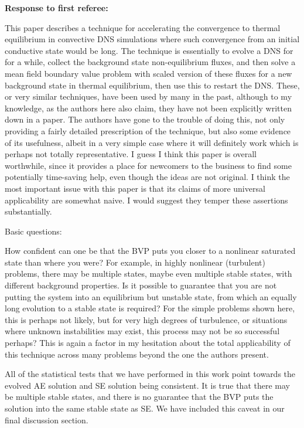 \documentclass[aps, 11pt, singlecolumn]{revtex4-1} %
\begin{document}
\begin{singlespace}
\newpage
\noindent
\Large{\textbf{Response to first referee:}}\newline$\,$\newline\indent

\begin{myquotation}
This paper describes a technique for accelerating the convergence to
thermal equilibrium in convective DNS simulations where such
convergence from an initial conductive state would be long. The
technique is essentially to evolve a DNS for for a while, collect the
background state non-equilibrium fluxes, and then solve a mean field
boundary value problem with scaled version of these fluxes for a new
background state in thermal equilibrium, then use this to restart the
DNS. These, or very similar techniques, have been used by many in the
past, although to my knowledge, as the authors here also claim, they
have not been explicitly written down in a paper. The authors have
gone to the trouble of doing this, not only providing a fairly
detailed prescription of the technique, but also some evidence of its
usefulness, albeit in a very simple case where it will definitely work
which is perhaps not totally representative. I guess I think this
paper is overall worthwhile, since it provides a place for newcomers
to the business to find some potentially time-saving help, even though
the ideas are not original. I think the most important issue with this
paper is that its claims of more universal applicability are somewhat
naive. I would suggest they temper these assertions substantially.

Basic questions:

How confident can one be that the BVP puts you closer to a nonlinear
saturated state than where you were? For example, in highly nonlinear
(turbulent) problems, there may be multiple states, maybe even
multiple stable states, with different background properties. Is it
possible to guarantee that you are not putting the system into an
equilibrium but unstable state, from which an equally long evolution
to a stable state is required? For the simple problems shown here,
this is perhaps not likely, but for very high degrees of turbulence,
or situations where unknown instabilities may exist, this process may
not be so successful perhaps? This is again a factor in my hesitation
about the total applicability of this technique across many problems
beyond the one the authors present.
\end{myquotation}
All of the statistical tests that we have performed in this work point towards
the evolved AE solution and SE solution being consistent.
It is true that there may be multiple stable states, and there
is no guarantee that the BVP puts the solution into the same stable state as
SE. We have included this caveat in our final discussion section.
 

\end{singlespace}
\end{document}
